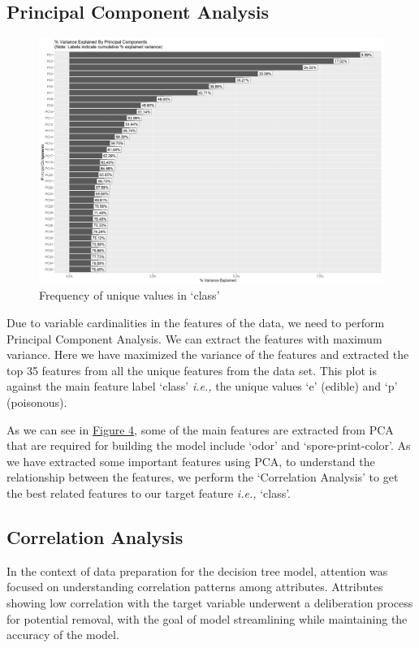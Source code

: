 \documentclass{article}
\begin{document}
\subsection{Principal Component Analysis}\label{subsection:pca}
\begin{figure}
    \begin{minipage}{\linewidth}
        \centering
        \includegraphics[width=0.9\linewidth]{./images/principal_component_analysis-1.png}
        \captionsetup{width=0.8\linewidth}
        \caption{Frequency of unique values in `class'}
        \label{img:4}
    \end{minipage}
\end{figure}

Due to variable cardinalities in the features of the data, we need to perform Principal Component Analysis. We can extract the features with maximum variance. Here we have maximized the variance of the features and extracted the top 35 features from all the unique features from the data set. This plot is against the main feature label `class' \textit{i.e.,} the unique values `e' (edible) and `p' (poisonous).

As we can see in \hyperref[img:4]{Figure 4}, some of the main features are extracted from PCA that are required for building the model include `odor' and `spore-print-color'. As we have extracted some important features using PCA, to understand the relationship between the features, we perform the `Correlation Analysis' to get the best related features to our target feature \textit{i.e.,} `class'.

\subsection{Correlation Analysis}\label{subsection:corr}
In the context of data preparation for the decision tree model, attention was focused on understanding correlation patterns among attributes. Attributes showing low correlation with the target variable underwent a deliberation process for potential removal, with the goal of model streamlining while maintaining the accuracy of the model.
\end{document}
